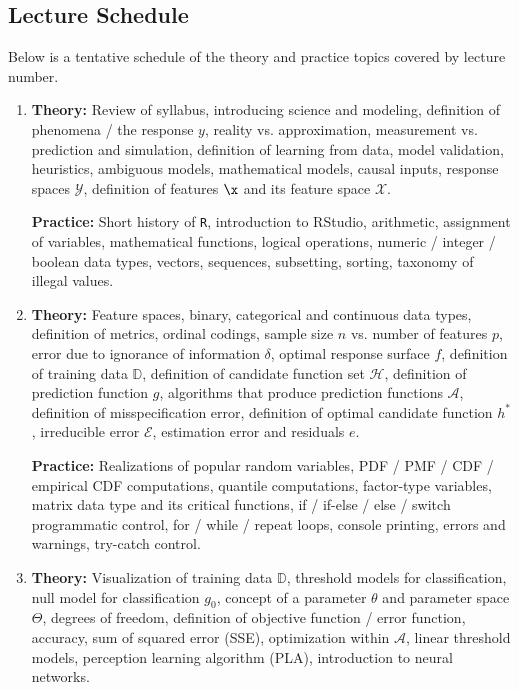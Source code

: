 
\subsection*{Lecture Schedule}

Below is a tentative schedule of the theory and practice topics covered by lecture number. 

\begin{enumerate}[(1)]
\item \textbf{Theory:} Review of syllabus, introducing science and modeling, definition of phenomena / the response $y$, reality vs. approximation, measurement vs. prediction and simulation, definition of learning from data, model validation, heuristics, ambiguous models, mathematical models, causal inputs, response spaces $\mathcal{Y}$, definition of features $\x$ and its feature space $\mathcal{X}$.

\textbf{Practice:} Short history of \texttt{R}, introduction to RStudio, arithmetic, assignment of variables, mathematical functions, logical operations, numeric / integer / boolean data types, vectors, sequences, subsetting, sorting, taxonomy of illegal values.

\item \textbf{Theory:} Feature spaces, binary, categorical and continuous data types, definition of metrics, ordinal codings, sample size $n$ vs. number of features $p$, error due to ignorance of information $\delta$, optimal response surface $f$, definition of training data $\mathbb{D}$, definition of candidate function set $\mathcal{H}$, definition of prediction function $g$, algorithms that produce prediction functions $\mathcal{A}$, definition of misspecification error, definition of optimal candidate function $h^*$, irreducible error $\mathcal{E}$, estimation error and residuals $e$.

\textbf{Practice:} Realizations of popular random variables, PDF / PMF / CDF / empirical CDF computations, quantile computations, factor-type variables, matrix data type and its critical functions, if / if-else / else / switch programmatic control, for / while / repeat loops, console printing, errors and warnings, try-catch control.

\item \textbf{Theory:} Visualization of training data $\mathbb{D}$, threshold models for classification, null model for classification $g_0$, concept of a parameter $\theta$ and parameter space $\Theta$, degrees of freedom, definition of objective function / error function, accuracy, sum of squared error (SSE), optimization within $\mathcal{A}$, linear threshold models, perception learning algorithm (PLA), introduction to neural networks.


\end{enumerate}
